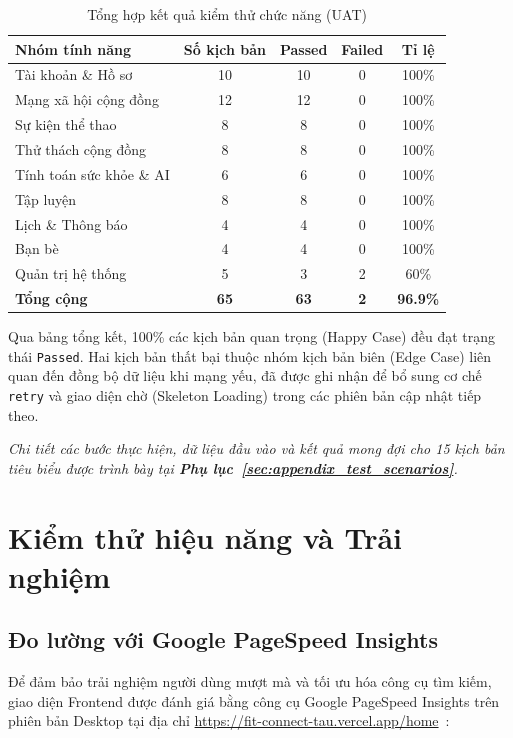 \begin{table}[H]
    \centering
    \caption{Tổng hợp kết quả kiểm thử chức năng (UAT)}
    \label{tab:tc_summary_final}
    \renewcommand{\arraystretch}{1.2}
    \begin{tabular}{|l|c|c|c|c|}
        \hline
        \textbf{Nhóm tính năng} & \textbf{Số kịch bản} & \textbf{Passed} & \textbf{Failed} & \textbf{Tỉ lệ} \\
        \hline
        Tài khoản \& Hồ sơ & 10 & 10 & 0 & 100\% \\
        \hline
        Mạng xã hội cộng đồng & 12 & 12 & 0 & 100\% \\
        \hline
        Sự kiện thể thao & 8 & 8 & 0 & 100\% \\
        \hline
        Thử thách cộng đồng & 8 & 8 & 0 & 100\% \\
        \hline
        Tính toán sức khỏe \& AI & 6 & 6 & 0 & 100\% \\
        \hline
        Tập luyện & 8 & 8 & 0 & 100\% \\
        \hline
        Lịch \& Thông báo & 4 & 4 & 0 & 100\% \\
        \hline
        Bạn bè & 4 & 4 & 0 & 100\% \\
        \hline
        Quản trị hệ thống & 5 & 3 & 2 & 60\% \\
        \hline
        \textbf{Tổng cộng} & \textbf{65} & \textbf{63} & \textbf{2} & \textbf{96.9\%} \\
        \hline
    \end{tabular}
\end{table}

Qua bảng tổng kết, 100\% các kịch bản quan trọng (Happy Case) đều đạt trạng thái \texttt{Passed}. Hai kịch bản thất bại thuộc nhóm kịch bản biên (Edge Case) liên quan đến đồng bộ dữ liệu khi mạng yếu, đã được ghi nhận để bổ sung cơ chế \texttt{retry} và giao diện chờ (Skeleton Loading) trong các phiên bản cập nhật tiếp theo.

\textit{Chi tiết các bước thực hiện, dữ liệu đầu vào và kết quả mong đợi cho 15 kịch bản tiêu biểu được trình bày tại \textbf{Phụ lục~\ref{sec:appendix_test_scenarios}}.}


\section{Kiểm thử hiệu năng và Trải nghiệm}
\label{sec:test_performance}

\subsection{Đo lường với Google PageSpeed Insights}
Để đảm bảo trải nghiệm người dùng mượt mà và tối ưu hóa công cụ tìm kiếm, giao diện Frontend được đánh giá bằng công cụ Google PageSpeed Insights trên phiên bản Desktop tại địa chỉ \url{https://fit-connect-tau.vercel.app/home}~\cite{PageSpeedInsights}:

